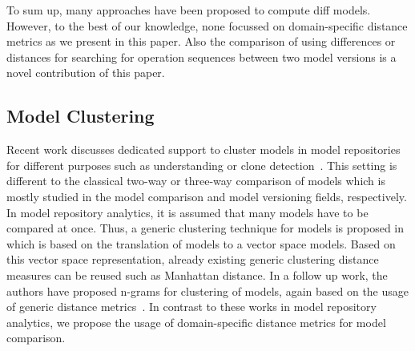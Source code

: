 To sum up, many approaches have been proposed to compute diff models. However, to the best of our knowledge, none focussed on domain-specific distance metrics as we present in this paper. Also the comparison of using differences or distances for searching for operation sequences between two model versions is a novel contribution of this paper.

\subsection{Model Clustering}

Recent work discusses dedicated support to cluster models in model repositories for different purposes such as understanding or clone detection~\cite{BaburCB18,BaburCVB16,BaburC17}. This setting is different to the classical two-way or three-way comparison of models which is mostly studied in the model comparison and model versioning fields, respectively. In model repository analytics, it is assumed that many models have to be compared at once. Thus, a generic clustering technique for models is proposed in~\cite{BaburCVB16} which is based on the translation of models to a vector space models. Based on this vector space representation, already existing generic clustering distance measures can be reused such as Manhattan distance. In a follow up work, the authors have proposed n-grams for clustering of models, again based on the usage of generic distance metrics~\cite{BaburC17,BaburCB18}. In contrast to these works in model repository analytics, we propose the usage of domain-specific distance metrics for model comparison. 